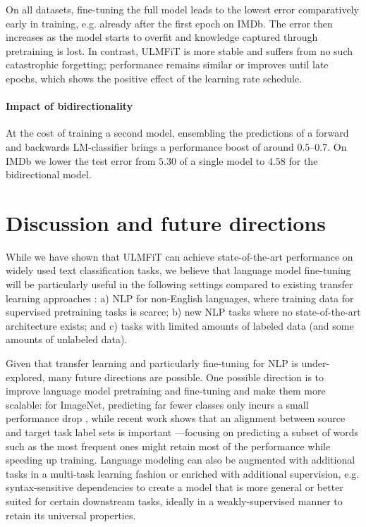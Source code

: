 \documentclass[11pt,a4paper]{article}
\begin{document}
On all datasets, fine-tuning the full model leads to the lowest error comparatively early in training, e.g. already after the first epoch on IMDb. The error then increases as the model starts to overfit and knowledge captured through pretraining is lost. In contrast, ULMFiT is more stable and suffers from no such catastrophic forgetting; performance remains similar or improves until late epochs, which shows the positive effect of the learning rate schedule.

\paragraph{Impact of bidirectionality} At the cost of training a second model, ensembling the predictions of a forward and backwards LM-classifier brings a performance boost of around $0.5$--$0.7$. On IMDb we lower the test error from $5.30$ of a single model to $4.58$ for the bidirectional model.

\section{Discussion and future directions}

While we have shown that ULMFiT can achieve state-of-the-art performance on widely used text classification tasks, we believe that language model fine-tuning will be particularly useful in the following settings compared to existing transfer learning approaches \cite{Conneau2017,Mccann2017,deepcontext2017}: a) NLP for non-English languages, where training data for supervised pretraining tasks is scarce; b) new NLP tasks where no state-of-the-art architecture exists; and c) tasks with limited amounts of labeled data (and some amounts of unlabeled data).

Given that transfer learning and particularly fine-tuning for NLP is under-explored, many future directions are possible. One possible direction is to improve language model pretraining and fine-tuning and make them more scalable: for ImageNet, predicting far fewer classes only incurs a small performance drop \cite{Huh2016}, while recent work shows that an alignment between source and target task label sets is important \cite{Mahajan2018}---focusing on predicting a subset of words such as the most frequent ones might retain most of the performance while speeding up training. Language modeling can also be augmented with additional tasks in a multi-task learning fashion \cite{Caruana1993} or enriched with additional supervision, e.g. syntax-sensitive dependencies \cite{linzen2016assessing} to create a model that is more general or better suited for certain downstream tasks, ideally in a weakly-supervised manner to retain its universal properties.
\end{document}
